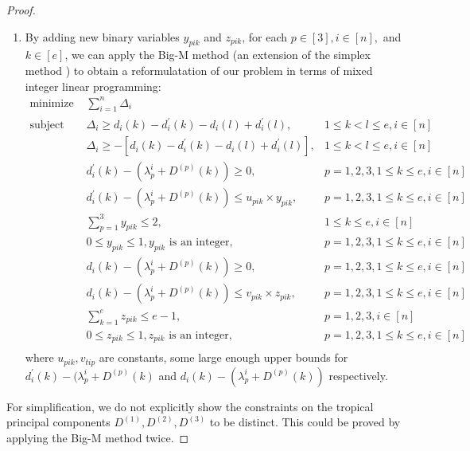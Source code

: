\documentclass[12pt]{extarticle}
\numberwithin{theorem}{section}
\begin{document}
\begin{proof}
\begin{enumerate}[label=(\roman*)]
\item By adding new binary variables $y_{pik}$ and $z_{pik}$, for each $p\in [3], i\in [n],$ and $k\in [e]$, we can apply the
  Big-M method (an extension of the simplex method \cite{bigM}) to obtain a reformulatation of our problem in terms of mixed integer linear programming:
\begin{align}
\text{minimize }& {}\sum_{i=1}^{n} \Delta_i &\\\nonumber
\text{subject to: } &\Delta_i \ge
d_{i}(k)-d^{'}_{i}(k)-d_{i}(l)+d^{'}_{i}(l), & 1 \le k < l \le e, i\in [n]\\\nonumber
&\Delta_i \ge
-[d_{i}(k)-d^{'}_{i}(k)-d_{i}(l)+d^{'}_{i}(l)], & 1 \le k < l \le e,i\in [n]\\\nonumber
&d^{'}_{i}(k) - (\lambda_p^i+D^{(p)}(k)) \ge 0, & p=1,2,3,1\le k \le e, i\in [n]\\\nonumber
&d^{'}_{i}(k)-(\lambda_p^i+D^{(p)}(k) )\le u_{pik} \times y_{pik}, & p=1,2,3, 1\le k \le e, i\in [n] \\\nonumber
&\sum_{p=1}^3 y_{pik} \le 2, & 1\le k \le e,  i\in [n] \\\nonumber
&0\le y_{pik}\le 1, y_{pik} \text{ is an integer}, & p=1,2,3, 1\le k \le e, i\in [n] \\\nonumber
&d_i (k) - (\lambda_p^i +  D^{(p)}(k))\ge 0, & p=1,2,3,1\le k \le e, i\in [n] \\\nonumber
&d_{i}(k)-(\lambda_p^i+D^{(p)}(k)) \le v_{pik}\times z_{pik}, & p=1,2,3, 1\le k \le e, i\in [n] \\\nonumber
&\sum_{k=1}^e z_{pik} \le e-1, & p=1,2,3,i\in [n] \\\nonumber
&0\le z_{pik}\le 1, z_{pik} \text{ is an integer},& p=1,2,3, 1\le k \le e, i\in [n] \\\nonumber
\end{align}
where $u_{pik},v_{tip}$ are constants, some large enough upper bounds for $d^{'}_{i}(k)-(\lambda_p^i+D^{(p)}(k)$ and $d_{i}(k)-(\lambda_p^i+D^{(p)}(k))$ respectively.

\end{enumerate}
For simplification, we do not explicitly show the constraints on the tropical principal components $D^{(1)},D^{(2)},D^{(3)}$ to be distinct. This could be proved by applying the Big-M method twice. %
\end{proof}
\end{document}
